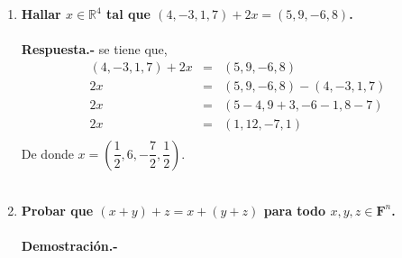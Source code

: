 \begin{multicols}{2}
\begin{enumerate}
     \item \textbf{ \boldmath Hallar $x\in \mathbb{R}^4$ tal que $(4,-3,1,7)+2x=(5,9,-6,8)$.}\\\\
	 \textbf{Respuesta.-}\; se tiene que,
	 $$\begin{array}{rcl}
	     (4,-3,1,7)+2x&=&(5,9,-6,8)\\
			  2x&=&(5,9,-6,8)-(4,-3,1,7)\\
			    2x&=&(5-4,9+3,-6-1,8-7)\\
			    2x&=&(1,12,-7,1)\\
	 \end{array}$$
	 De donde $x=\left(\dfrac{1}{2},6,-\dfrac{7}{2},\dfrac{1}{2}\right).$\\\\

     \item \textbf{\boldmath Probar que $(x+y)+z=x+(y+z)$ para todo $x,y,z\in \mathbf{F}^n$.}\\\\
	 \textbf{Demostración.-}\; 

	 




\end{enumerate}

\end{multicols}
